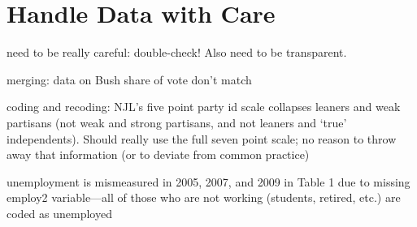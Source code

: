 

\section{Handle Data with Care}

need to be really careful: double-check!  Also need to be transparent.

merging: data on Bush share of vote don't match



coding and recoding: NJL's five point party id scale collapses leaners and weak partisans (not weak and strong partisans, and not leaners and `true' independents).  Should really use the full seven point scale; no reason to throw away that information (or to deviate from common practice)

unemployment is mismeasured in 2005, 2007, and 2009 in Table 1 due to missing employ2 variable---all of those who are not working (students, retired, etc.) are coded as unemployed
